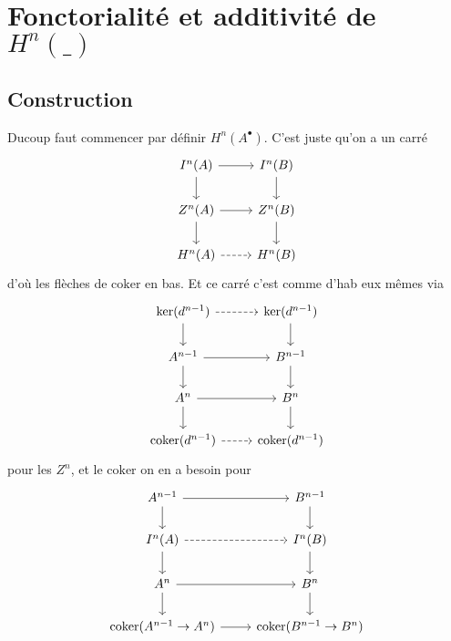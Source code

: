 \documentclass[a4paper,12pt]{book}
\newcommand{\coker}{\textrm{coker}}
\theoremstyle{plain}
\theoremstyle{definition}
\theoremstyle{remark}
\begin{document}
\section{Fonctorialité et additivité de $H^n(\_)$}
\subsection{Construction}
Ducoup faut commencer par définir $H^n(A^\bullet)$. C'est juste
qu'on a un carré
\[\begin{tikzcd}
	{I^n(A)} & {I^n(B)} \\
	{Z^n(A)} & {Z^n(B)} \\
	{H^n(A)} & {H^n(B)}
	\arrow[from=1-1, to=1-2]
	\arrow[from=1-1, to=2-1]
	\arrow[from=1-2, to=2-2]
	\arrow[from=2-1, to=2-2]
	\arrow[from=2-1, to=3-1]
	\arrow[from=2-2, to=3-2]
	\arrow[dashed, from=3-1, to=3-2]
\end{tikzcd}\]
d'où les flèches de $\coker$ en bas. Et ce carré c'est comme
d'hab eux mêmes via
\[\begin{tikzcd}
	{\ker(d^{n-1})} & {\ker(d^{n-1})} \\
	{A^{n-1}} & {B^{n-1}} \\
	{A^n} & {B^n} \\
	{\coker(d^{n-1})} & {\coker(d^{n-1})}
	\arrow[dashed, from=1-1, to=1-2]
	\arrow[from=1-1, to=2-1]
	\arrow[from=1-2, to=2-2]
	\arrow[from=2-1, to=2-2]
	\arrow[from=2-1, to=3-1]
	\arrow[from=2-2, to=3-2]
	\arrow[from=3-1, to=3-2]
	\arrow[from=3-1, to=4-1]
	\arrow[from=3-2, to=4-2]
	\arrow[dashed, from=4-1, to=4-2]
\end{tikzcd}\]
pour les $Z^n$, et le $\coker$ on en a besoin pour
\[\begin{tikzcd}
	{A^{n-1}} & {B^{n-1}} \\
	{I^n(A)} & {I^n(B)} \\
	{A^n} & {B^n} \\
	{\coker(A^{n-1}\to A^{n})} & {\coker(B^{n-1}\to B^{n})}
	\arrow[from=1-1, to=1-2]
	\arrow[from=1-1, to=2-1]
	\arrow[from=1-2, to=2-2]
	\arrow[dashed, from=2-1, to=2-2]
	\arrow[from=2-1, to=3-1]
	\arrow[from=2-2, to=3-2]
	\arrow[from=3-1, to=3-2]
	\arrow[from=3-1, to=4-1]
	\arrow[from=3-2, to=4-2]
	\arrow[from=4-1, to=4-2]
\end{tikzcd}\]
\end{document}
